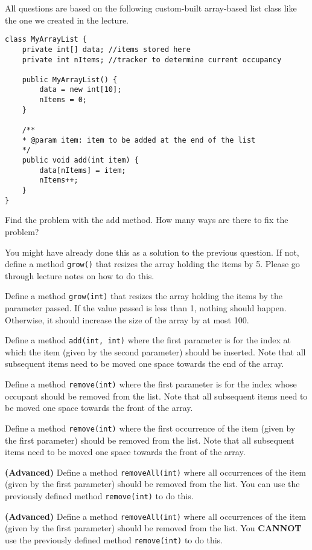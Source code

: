 \begin{questions}
All questions are based on the following custom-built array-based list class like the one we created in the lecture.

\begin{lstlisting}
class MyArrayList {
	private int[] data; //items stored here
	private int nItems; //tracker to determine current occupancy
	
	public MyArrayList() {
		data = new int[10];
		nItems = 0;
	}
	
	/**
	* @param item: item to be added at the end of the list
	*/
	public void add(int item) {
		data[nItems] = item;
		nItems++;
	}
}
\end{lstlisting}

\question Find the problem with the add method. How many ways are there to fix the problem?

\question You might have already done this as a solution to the previous question. If not, define a method \texttt{grow()} that resizes the array holding the items by 5. Please go through lecture notes on how to do this.

\question Define a method \texttt{grow(int)} that resizes the array holding the items by the parameter passed. If the value passed is less than 1, nothing should happen. Otherwise, it should increase the size of the array by at most 100.

\question Define a method \texttt{add(int, int)} where the first parameter is for the index at which the item (given by the second parameter) should be inserted. Note that all subsequent items need to be moved one space towards the end of the array.

\question Define a method \texttt{remove(int)} where the first parameter is for the index whose occupant should be removed from the list. Note that all subsequent items need to be moved one space towards the front of the array.	

\question Define a method \texttt{remove(int)} where the first occurrence of the item (given by the first parameter) should be removed from the list. Note that all subsequent items need to be moved one space towards the front of the array.

\question \textbf{(Advanced)} Define a method \texttt{removeAll(int)} where all occurrences of the item (given by the first parameter) should be removed from the list. You can use the previously defined method \texttt{remove(int)} to do this.

\question \textbf{(Advanced)} Define a method \texttt{removeAll(int)} where all occurrences of the item (given by the first parameter) should be removed from the list. You \textbf{CANNOT} use the previously defined method \texttt{remove(int)} to do this.
\end{questions}


